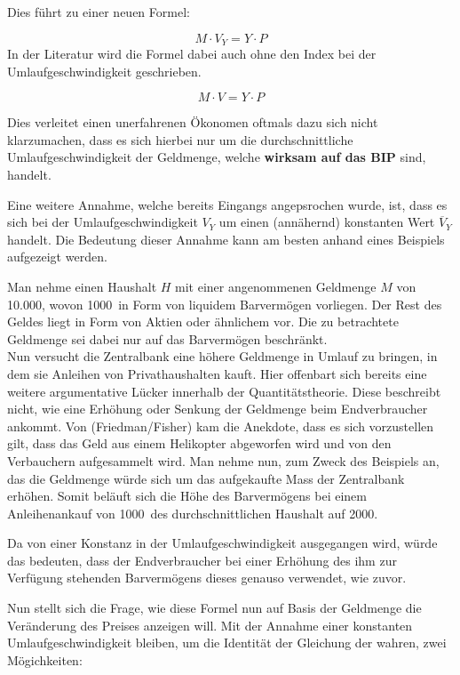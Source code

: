 Dies führt zu einer neuen Formel: 

$$ M \cdot V_Y = Y \cdot P$$\label{QFormel}
In der Literatur wird die Formel dabei auch ohne den Index bei der Umlaufgeschwindigkeit geschrieben.

$$ M \cdot V = Y \cdot P$$

Dies verleitet einen unerfahrenen Ökonomen oftmals dazu sich nicht klarzumachen, dass es sich hierbei nur um die durchschnittliche Umlaufgeschwindigkeit der Geldmenge, welche \textbf{wirksam auf das BIP} sind, handelt.

Eine weitere Annahme, welche bereits Eingangs angepsrochen wurde, ist, dass es sich bei der Umlaufgeschwindigkeit $V_Y$ um einen (annähernd) konstanten Wert $\overline{V}_Y$ handelt. Die Bedeutung dieser Annahme kann am besten anhand eines Beispiels aufgezeigt werden.

\begin{example}
    Man nehme einen Haushalt $H$ mit einer angenommenen Geldmenge $M$ von 10.000\EUR, wovon 1000\EUR\ in Form von liquidem Barvermögen vorliegen. Der Rest des Geldes liegt in Form von Aktien oder ähnlichem vor. Die zu betrachtete Geldmenge sei dabei nur auf das Barvermögen beschränkt. \\
    Nun versucht die Zentralbank eine höhere Geldmenge in Umlauf zu bringen, in dem sie Anleihen von Privathaushalten kauft. Hier offenbart sich bereits eine weitere argumentative Lücker innerhalb der Quantitätstheorie. Diese beschreibt nicht, wie eine Erhöhung oder Senkung der Geldmenge beim Endverbraucher ankommt. Von (Friedman/Fisher) kam die Anekdote, dass es sich vorzustellen gilt, dass das Geld aus einem Helikopter abgeworfen wird und von den Verbauchern aufgesammelt wird. Man nehme nun, zum Zweck des Beispiels an, das die Geldmenge würde sich um das aufgekaufte Mass der Zentralbank erhöhen. Somit beläuft sich die Höhe des Barvermögens bei einem Anleihenankauf von 1000\EUR\, des durchschnittlichen Haushalt auf 2000\EUR. 

    Da von einer Konstanz in der Umlaufgeschwindigkeit ausgegangen wird, würde das bedeuten, dass der Endverbraucher bei einer Erhöhung des ihm zur Verfügung stehenden Barvermögens dieses genauso verwendet, wie zuvor. 
\end{example}\label{Bsp.kUmlauf}

Nun stellt sich die Frage, wie diese Formel nun auf Basis der Geldmenge die Veränderung des Preises anzeigen will. Mit der Annahme einer konstanten Umlaufgeschwindigkeit bleiben, um die Identität der Gleichung der wahren, zwei Mögichkeiten:

